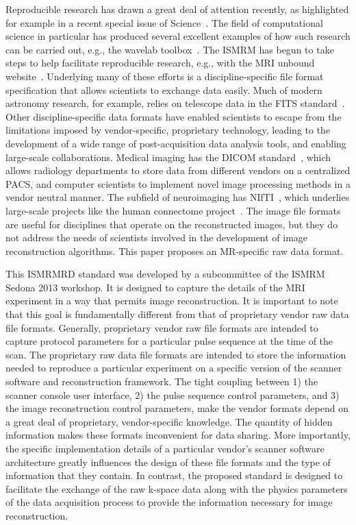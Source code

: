 \documentclass[12pt, draft]{article}
\begin{document}
Reproducible research has drawn a great deal of attention recently, as highlighted for example in a recent special issue of Science~\cite{Jasny:2011again, Peng:2011reproducible}. The field of computational science in particular has produced several excellent examples of how such research can be carried out, e.g., the wavelab toolbox~\cite{wavelab}.  The ISMRM has begun to take steps to help facilitate reproducible research, e.g., with the MRI unbound website~\cite{mri_unbound}. Underlying many of these efforts is a discipline-specific file format specification that allows scientists to exchange data easily.  Much of modern astronomy research, for example, relies on telescope data in the FITS standard~\cite{fits}.  Other discipline-specific data formats have enabled scientists to escape from the limitations imposed by vendor-specific, proprietary technology, leading to the development of a wide range of post-acquisition data analysis tools, and enabling large-scale collaborations.  Medical imaging has the DICOM standard~\cite{dicom}, which allows radiology departments to store data from different vendors on a centralized PACS, and computer scientists to implement novel image processing methods in a vendor neutral manner. The subfield of neuroimaging has NIfTI~\cite{nifti}, which underlies large-scale projects like the human connectome project~\cite{connectome}. The image file formats are useful for disciplines that operate on the reconstructed images, but they do not address the needs of scientists involved in the development of image reconstruction algorithms. This paper proposes an MR-specific raw data format. 

This ISMRMRD standard was developed by a subcommittee of the ISMRM Sedona 2013 workshop.  It is designed to capture the details of the MRI experiment in a way that permits image reconstruction.  It is important to note that this goal is fundamentally different from that of proprietary vendor raw data file formats.  Generally, proprietary vendor raw file formats are intended to capture protocol parameters for a particular pulse sequence at the time of the scan.  The proprietary raw data file formats are intended to store the information needed to reproduce a particular experiment on a specific version of the scanner software and reconstruction framework.  The tight coupling between 1) the scanner console user interface, 2) the pulse sequence control parameters, and 3) the image reconstruction control parameters, make the vendor formats depend on a great deal of proprietary, vendor-specific knowledge. The quantity of hidden information makes these formats inconvenient for data sharing.  More importantly, the specific implementation details of a particular vendor's scanner software architecture greatly influences the design of these file formats and the type of information that they contain.  In contrast, the proposed standard is designed to facilitate the exchange of the raw k-space data along with the physics parameters of the data acquisition process to provide the information necessary for image reconstruction.
\end{document}
